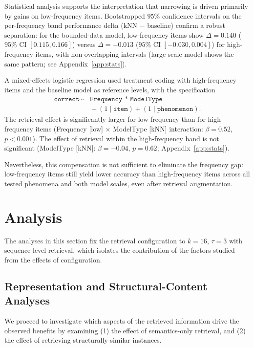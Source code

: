 Statistical analysis supports the interpretation that narrowing is driven primarily by gains on low-frequency items. Bootstrapped $95\%$ confidence intervals on the per-frequency band performance delta (kNN $-$ baseline) confirm a robust separation: for the bounded-data model, low-frequency items show $\Delta = 0.140$ ($95\%$ CI $[0.115, 0.166]$) versus $\Delta = -0.013$ ($95\%$ CI $[-0.030, 0.004]$) for high-frequency items, with non-overlapping intervals (large-scale model shows the same pattern; see Appendix~\ref{app:stats}).

A mixed-effects logistic regression used treatment coding with high-frequency items and the baseline model as reference levels, with the specification
\[
\begin{aligned}
\texttt{correct} \sim{}& \texttt{Frequency * ModelType} \\
&{}+ (1\mid\texttt{item}) + (1\mid\texttt{phenomenon}).
\end{aligned}
\]
The retrieval effect is significantly larger for low-frequency than for high-frequency items (Frequency [low] $\times$ ModelType [kNN] interaction: $\beta = 0.52$, $p < 0.001$). The effect of retrieval within the high-frequency band is not significant (ModelType [kNN]: $\beta = -0.04$, $p = 0.62$; Appendix~\ref{app:stats}).

Nevertheless, this compensation is not sufficient to eliminate the frequency gap: low-frequency items still yield lower accuracy than high-frequency items across all tested phenomena and both model scales, even after retrieval augmentation.






\section{Analysis}

\noindent The analyses in this section fix the retrieval configuration to $k=16$, $\tau=3$ with sequence-level retrieval, which isolates the contribution of the factors studied from the effects of configuration. 

\subsection{Representation and Structural-Content Analyses}
\label{sec:multidimensional_binding}

We proceed to investigate which aspects of the retrieved information drive the observed benefits by examining (1) the effect of semantics-only retrieval, and (2) the effect of retrieving structurally similar instances.


